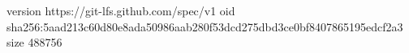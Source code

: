 version https://git-lfs.github.com/spec/v1
oid sha256:5aad213c60d80e8ada50986aab280f53dcd275dbd3ce0bf8407865195edcf2a3
size 488756
